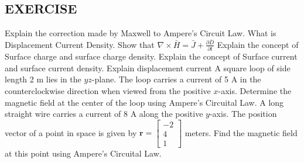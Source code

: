 \begin{mdframed}[backgroundcolor=lightblue, linewidth=1pt, hidealllines=true]
	\section{EXERCISE}
	
	\begin{ExerciseList}
			\Exercise[label={ex11}]Explain the correction made by Maxwell to 		Ampere's Circuit Law.
			\Exercise[label={ex12}] What is Displacement Current Density.
			\Exercise[label={ex13}] Show that $\nabla\times\bar{H}=\bar{J}+\frac{\partial\bar{D}}{\partial t}$
			\Exercise[label={ex14}] Explain the concept of Surface charge and surface charge density.
			\Exercise[label={ex15}] Explain the concept of Surface current and surface current density.
			\Exercise[label={ex16}] Explain displacement current
			\Exercise[label={ex17}] A square loop of side length 2 m lies in the $yz$-plane. The loop carries a current of 5 A in the counterclockwise direction when viewed from the positive $x$-axis. Determine the magnetic field at the center of the loop using Ampere's Circuital Law.
			\Exercise[label={ex17}] A long straight wire carries a current of 8 A along the positive $y$-axis. The position vector of a point in space is given by $\mathbf{r} = \begin{bmatrix} -2 \\ 4 \\ 1 \end{bmatrix}$ meters. Find the magnetic field at this point using Ampere's Circuital Law.
		\end{ExerciseList}
\end{mdframed}